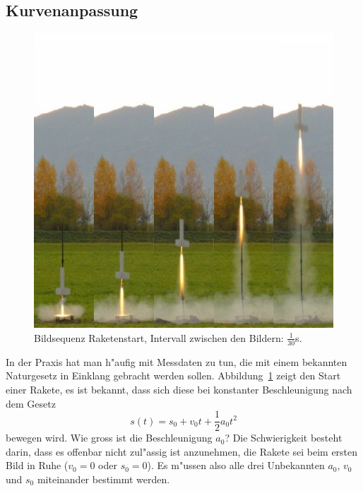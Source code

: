 %
%
\subsection{Kurvenanpassung}
\begin{figure}
\begin{center}
\includegraphics[width=0.6\hsize]{graphics/stummel}
\end{center}
\caption{Bildsequenz Raketenstart, Intervall zwischen den Bildern: $\frac1{30}$s.
\label{stummel}}
\end{figure}
In der Praxis hat man h"aufig mit Messdaten zu tun, die mit einem
bekannten Naturgesetz in Einklang gebracht werden sollen.
Abbildung~\ref{stummel} zeigt den Start einer Rakete, es ist
bekannt, dass sich diese bei konstanter Beschleunigung nach dem
Gesetz
\[
s(t)=s_0+v_0t+\frac12a_0t^2
\]
bewegen wird. Wie gross ist die Beschleunigung $a_0$?
Die Schwierigkeit besteht darin, dass es offenbar nicht zul"assig ist
anzunehmen, die Rakete sei beim ersten Bild in Ruhe ($v_0=0$ oder
$s_0=0$). Es m"ussen also alle drei Unbekannten $a_0$, $v_0$
und $s_0$ miteinander bestimmt werden.

